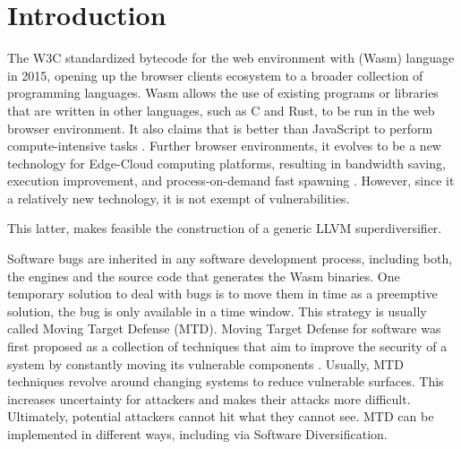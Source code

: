 \chapter{Introduction}





The W3C standardized bytecode for the web environment with \wasm (Wasm) language in 2015, opening up the browser clients ecosystem to a broader collection of programming languages. Wasm allows the use of existing programs or libraries that are written in other languages, such as C and Rust, to be run in the web browser environment. It also claims that is better than JavaScript to perform compute-intensive tasks \cite{Haas_2017}. 
Further browser environments, it evolves to be a new technology for Edge-Cloud computing platforms, resulting in bandwidth saving, execution improvement, and process-on-demand fast spawning \cite{9640153, wen2020wasmachine}. However, since it a relatively new technology, it is not exempt of vulnerabilities.

This latter, makes feasible the construction of a generic LLVM superdiversifier. 

Software bugs are inherited in any software development process, including both, the \wasm engines and the source code that generates the Wasm binaries. One temporary solution to deal with bugs is to move them in time as a preemptive solution, the bug is only available in a time window. This strategy is usually called Moving Target Defense (MTD). Moving Target Defense for software was first proposed as a collection of techniques that aim to improve the security of a system by constantly moving its vulnerable components \cite{MTDNationalCyberLaep, okhravi2013survey}. Usually, MTD techniques revolve around changing systems to reduce vulnerable surfaces. This increases uncertainty for attackers and makes their attacks more difficult. Ultimately, potential attackers cannot hit what they cannot see. MTD can be implemented in different ways, including via Software Diversification. 


